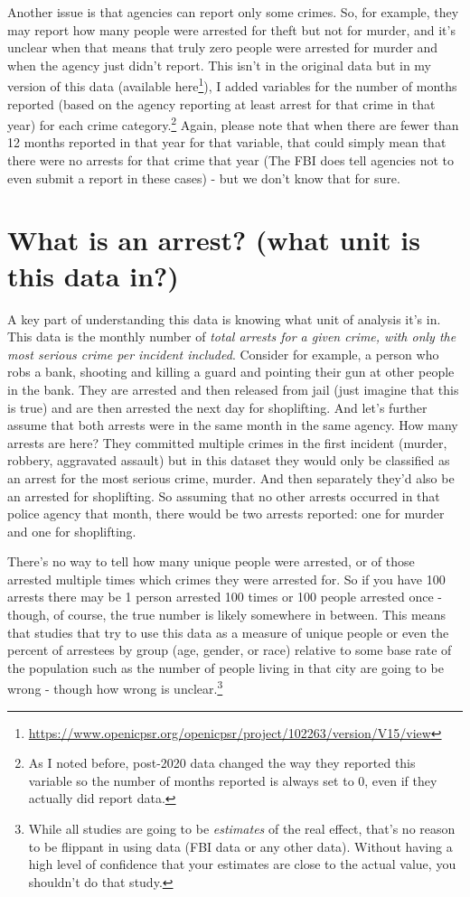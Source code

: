 \documentclass[
]{krantz}
\renewcommand{\href}[2]{#2\footnote{\url{#1}}}
\begin{document}
Another issue is that agencies can report only some crimes.
So, for example, they may report how many people were
arrested for theft but not for murder, and it's unclear when
that means that truly zero people were arrested for murder
and when the agency just didn't report. This isn't in the
original data but in my version of this data (available
\href{https://www.openicpsr.org/openicpsr/project/102263/version/V15/view}{here}),
I added variables for the number of months reported (based
on the agency reporting at least arrest for that crime in
that year) for each crime category.\footnote{As I noted
  before, post-2020 data changed the way they reported this
  variable so the number of months reported is always set to
  0, even if they actually did report data.} Again, please
note that when there are fewer than 12 months reported in
that year for that variable, that could simply mean that
there were no arrests for that crime that year (The FBI does
tell agencies not to even submit a report in these cases) -
but we don't know that for sure.

\section{What is an arrest? (what unit is this data
in?)}\label{what-is-an-arrest-what-unit-is-this-data-in}

A key part of understanding this data is knowing what unit
of analysis it's in. This data is the monthly number of
\emph{total arrests for a given crime, with only the most
serious crime per incident included}. Consider for example,
a person who robs a bank, shooting and killing a guard and
pointing their gun at other people in the bank. They are
arrested and then released from jail (just imagine that this
is true) and are then arrested the next day for shoplifting.
And let's further assume that both arrests were in the same
month in the same agency. How many arrests are here? They
committed multiple crimes in the first incident (murder,
robbery, aggravated assault) but in this dataset they would
only be classified as an arrest for the most serious crime,
murder. And then separately they'd also be an arrested for
shoplifting. So assuming that no other arrests occurred in
that police agency that month, there would be two arrests
reported: one for murder and one for shoplifting.

There's no way to tell how many unique people were arrested,
or of those arrested multiple times which crimes they were
arrested for. So if you have 100 arrests there may be 1
person arrested 100 times or 100 people arrested once -
though, of course, the true number is likely somewhere in
between. This means that studies that try to use this data
as a measure of unique people or even the percent of
arrestees by group (age, gender, or race) relative to some
base rate of the population such as the number of people
living in that city are going to be wrong - though how wrong
is unclear.\footnote{While all studies are going to be
  \emph{estimates} of the real effect, that's no reason to
  be flippant in using data (FBI data or any other data).
  Without having a high level of confidence that your
  estimates are close to the actual value, you shouldn't do
  that study.}
\end{document}

